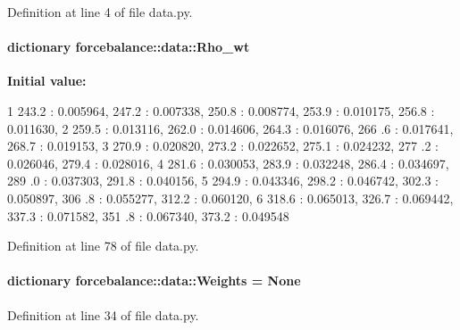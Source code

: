 \-Definition at line 4 of file data.\-py.

\hypertarget{namespaceforcebalance_1_1data_a215c92b741d8fdf8d1d207f4ba004757}{
\paragraph[{\-Rho\-\_\-wt}]{\setlength{\rightskip}{0pt plus 5cm}dictionary {\bf forcebalance\-::data\-::\-Rho\-\_\-wt}}}\label{namespaceforcebalance_1_1data_a215c92b741d8fdf8d1d207f4ba004757}
{\bfseries \-Initial value\-:}
\begin{DoxyCode}
1 {243.2 : 0.005964, 247.2 : 0.007338, 250.8 : 0.008774, 253.9 : 0.010175, 256.8 
      : 0.011630, 
2                       259.5 : 0.013116, 262.0 : 0.014606, 264.3 : 0.016076, 266
      .6 : 0.017641, 268.7 : 0.019153, 
3                       270.9 : 0.020820, 273.2 : 0.022652, 275.1 : 0.024232, 277
      .2 : 0.026046, 279.4 : 0.028016, 
4                       281.6 : 0.030053, 283.9 : 0.032248, 286.4 : 0.034697, 289
      .0 : 0.037303, 291.8 : 0.040156, 
5                       294.9 : 0.043346, 298.2 : 0.046742, 302.3 : 0.050897, 306
      .8 : 0.055277, 312.2 : 0.060120, 
6                       318.6 : 0.065013, 326.7 : 0.069442, 337.3 : 0.071582, 351
      .8 : 0.067340, 373.2 : 0.049548}
\end{DoxyCode}


\-Definition at line 78 of file data.\-py.

\hypertarget{namespaceforcebalance_1_1data_a56682bb9f72fbaf228f67a9b7c3b260c}{
\paragraph[{\-Weights}]{\setlength{\rightskip}{0pt plus 5cm}dictionary {\bf forcebalance\-::data\-::\-Weights} = \-None}}\label{namespaceforcebalance_1_1data_a56682bb9f72fbaf228f67a9b7c3b260c}


\-Definition at line 34 of file data.\-py.

